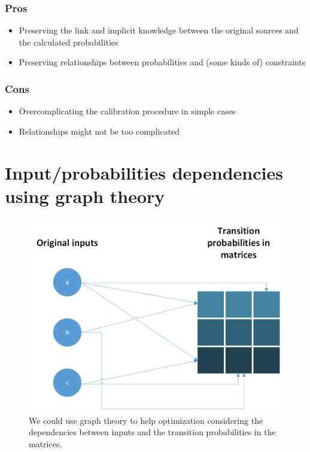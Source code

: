 \subsubsection*{Pros}
\begin{itemize}
	\item Preserving the link and implicit knowledge between the original sources and the calculated probabilities
	\item Preserving relationships between probabilities and (some kinds of) constraints
\end{itemize}

\subsubsection*{Cons}
\begin{itemize}
	\item Overcomplicating the calibration procedure in simple cases
	\item Relationships might not be too complicated
\end{itemize}

\section{Input/probabilities dependencies using graph theory}

\begin{figure}[h!]
	\centering
	\includegraphics[width=\textwidth]{figures/graph_input_probs}
	\decoRule
	\caption[Dependency graph between inputs and transition probabilities]{We could use graph theory to help optimization considering the dependencies between inputs and the transition probabilities in the matrices.}
	\label{fig:graph_input_probs}
\end{figure}


